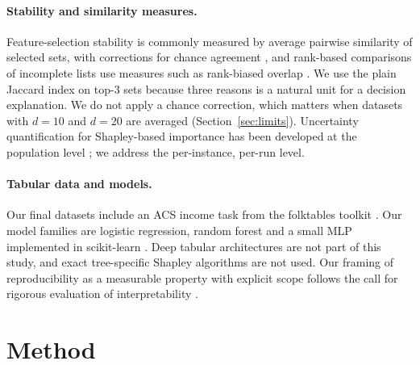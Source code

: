 \documentclass{article}
\begin{document}
\paragraph{Stability and similarity measures.}
Feature-selection stability is commonly measured by average pairwise similarity of selected sets, with corrections for chance agreement \citep{Nogueira2017Stability}, and rank-based comparisons of incomplete lists use measures such as rank-biased overlap \citep{Webber2010similarity}. We use the plain Jaccard index on top-3 sets because three reasons is a natural unit for a decision explanation. We do not apply a chance correction, which matters when datasets with $d=10$ and $d=20$ are averaged (Section~\ref{sec:limits}). Uncertainty quantification for Shapley-based importance has been developed at the population level \citep{Williamson2020Efficient}; we address the per-instance, per-run level.

\paragraph{Tabular data and models.}
Our final datasets include an ACS income task from the folktables toolkit \citep{Ding2021Retiring}. Our model families are logistic regression, random forest and a small MLP implemented in scikit-learn \citep{Pedregosa2012Scikit}. Deep tabular architectures \citep{Gorishniy2021Revisiting} are not part of this study, and exact tree-specific Shapley algorithms \citep{Lundberg2018Consistent} are not used. Our framing of reproducibility as a measurable property with explicit scope follows the call for rigorous evaluation of interpretability \citep{DoshiVelez2017Towards}.

\section{Method}\label{sec:method}
\end{document}
